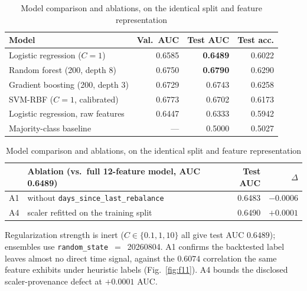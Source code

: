 \begin{table}[tb]
\caption{Model comparison and ablations, on the identical split and feature
representation}
\label{tab:t6}
\centering
\scriptsize
\setlength{\tabcolsep}{3pt}
\begin{tabular}{@{}lrrr@{}}
\toprule
Model & Val.\ AUC & Test AUC & Test acc. \\
\midrule
Logistic regression ($C=1$) & 0.6585 & \textbf{0.6489} & 0.6022 \\
Random forest (200, depth 8) & 0.6750 & \textbf{0.6790} & 0.6290 \\
Gradient boosting (200, depth 3) & 0.6729 & 0.6743 & 0.6258 \\
SVM-RBF ($C=1$, calibrated) & 0.6773 & 0.6702 & 0.6173 \\
Logistic regression, raw features & 0.6447 & 0.6333 & 0.5942 \\
Majority-class baseline & --- & 0.5000 & 0.5027 \\
\bottomrule
\end{tabular}

\vspace{1mm}
\begin{tabular}{@{}llrr@{}}
\toprule
& Ablation (vs.\ full 12-feature model, AUC 0.6489) & Test AUC & $\Delta$ \\
\midrule
A1 & without \texttt{days\_since\_last\_rebalance} & 0.6483 & $-0.0006$ \\
A4 & scaler refitted on the training split & 0.6490 & $+0.0001$ \\
\bottomrule
\end{tabular}

\vspace{0.5mm}
\raggedright\footnotesize
Regularization strength is inert ($C\in\{0.1,1,10\}$ all give test AUC
$0.6489$); ensembles use \texttt{random\_state}~$=$~20260804. A1 confirms the
backtested label leaves almost no direct time signal, against the $0.6074$
correlation the same feature exhibits under heuristic labels
(Fig.~\ref{fig:f11}). A4 bounds the disclosed scaler-provenance defect at
$+0.0001$ AUC.
\end{table}
